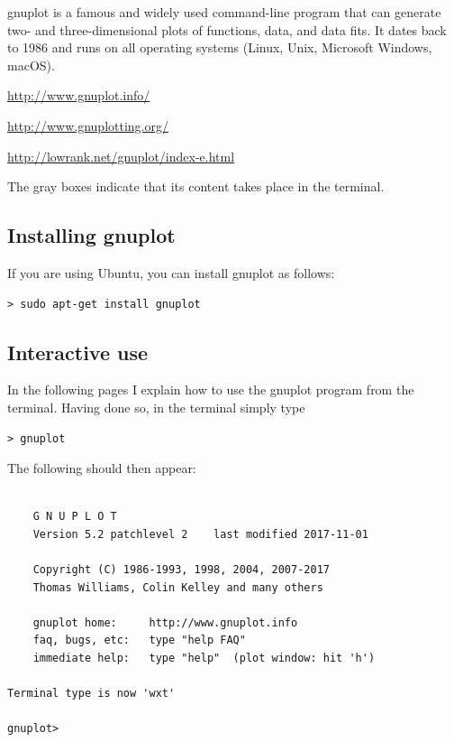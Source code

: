 
gnuplot is a famous and widely used command-line program that can 
generate two- and three-dimensional plots of functions, data, and data fits.
It dates back to 1986 and runs on all operating systems (Linux, Unix, Microsoft Windows, macOS). 

\url{http://www.gnuplot.info/}

\url{http://www.gnuplotting.org/}

\url{http://lowrank.net/gnuplot/index-e.html}

The gray boxes indicate that its content takes place in the terminal.

\subsection*{Installing gnuplot}

If you are using Ubuntu, you can install gnuplot as follows:


\begin{mdframed}[backgroundcolor=gray!10]
\begin{verbatim}
> sudo apt-get install gnuplot
\end{verbatim}
\end{mdframed}


\subsection*{Interactive use}

In the following pages I explain how to use the gnuplot program from the terminal.
Having done so, in the terminal simply type

\begin{mdframed}[backgroundcolor=gray!10]
\begin{verbatim}
> gnuplot
\end{verbatim}
\end{mdframed}

The following should then appear:

\begin{mdframed}[backgroundcolor=gray!10]
\begin{verbatim}

	G N U P L O T
	Version 5.2 patchlevel 2    last modified 2017-11-01 

	Copyright (C) 1986-1993, 1998, 2004, 2007-2017
	Thomas Williams, Colin Kelley and many others

	gnuplot home:     http://www.gnuplot.info
	faq, bugs, etc:   type "help FAQ"
	immediate help:   type "help"  (plot window: hit 'h')

Terminal type is now 'wxt'

gnuplot>
\end{verbatim}
\end{mdframed}

